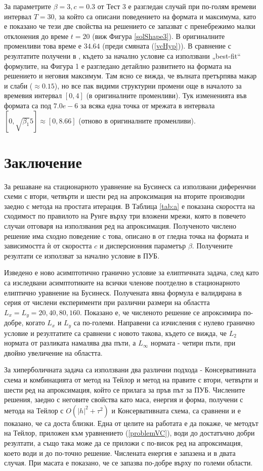 \documentclass[a5paper]{article}
\newcommand{\rf}[1]{(\ref{#1})}
\theoremstyle{remark}
\begin{document}
\begin{large}
За параметрите $\beta=3, c=0.3$ от Тест 3 е разгледан случай при по-голям времеви интервал $T=30$, за който са описани поведението на формата и максимума, като е показано че тези две свойства на решението се запазват с пренебрежимо малки отклонения до време $t=20$ (виж Фигура \ref{solShape3}). В оригиналните променливи това време е $34.64$ (преди смяната \rf{vcHyp}). 
В сравнение с резултатите получени в \cite{ref20}, където за начално условие са използвани „best-fit“ формулите, на Фигура 1 е разгледано детайлно развитието на формата на решението и неговия максимум. Там ясно се вижда, че вълната претърпява макар и слаби ($\approx 0.15$), но все пак видими структурни промени още в началото за времевия интервал $[0, 4]$ (в оригиналните променливи). Тук измененията във формата са под $7.0e-6$ за всяка една точка от мрежата в интервала $[0, \sqrt{\beta_1} 5] \approx [0, 8.66]$ (отново в оригиналните променливи).\\
\FloatBarrier

\section{Заключение}

За решаване на стационарното уравнение на Бусинеск са използвани диференчни схеми с втори, четвърти и шести ред на апроксимация на вторите производни заедно с метода на простата итерация. В Таблица \ref{tab:a} е показана скоростта на сходимост по правилото на Рунге върху три вложени мрежи, която в повечето случаи отговаря на използвания ред на апроксимация. Полученото числено решение има сходно поведение с това, описано в \cite{ref117,ref116} от гледна точка на формата и зависимостта ѝ от скоростта $c$ и дисперсионния параметър $\beta$. Получените резултати се използват за начално условие в ПУБ.

Изведено е ново асимптотично гранично условие за елиптичната задача, след като са изследвани асимптотиките на всички членове поотделно в стационарното елиптично уравнение на Бусинеск. Получената явна формула е валидирана в серия от числени експерименти при различни размери на областта $L_x=L_y=20,40,80,160$. Показано е, че численото решение се апроксимира по-добре, когато $L_x$ и $L_y$ са по-големи. Направени са изчисления с нулево гранично условие и резултатите са сравнени с новото такова, където се вижда, че $L_2$ нормата от разликата намалява два пъти, а $L_\infty$ нормата - четири пъти, при двойно увеличение на областта.

За хиперболичната задача са използвани два различни подхода - Консервативната схема и комбинацията от метод на Тейлор и метод на правите с втори, четвърти и шести ред на апроксимация, който се прилага за пръв път за ПУБ. Числените решения, заедно с неговите свойства като маса, енергия и форма, получени с метода на Тейлор с $O(|h|^2 + \tau^2)$ и Консервативната схема, са сравнени и е показано, че са доста близки. Една от целите на работата е да покаже, че методът на Тейлор, приложен към уравнението \rf{problemVC}, води до достатъчно добри резултати, а също така може да се приложи с по-висок ред на апроксимация, което води и до по-точно решение. Числената енергия е запазена и в двата случая. При масата е показано, че се запазва по-добре върху по големи области. 


\end{large}
\end{document}

